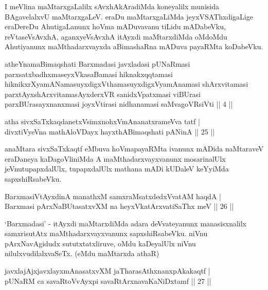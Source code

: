 \begin{artha}
I meVlina maMtarxgaLalilx sAvxhAkAradiMda koneyalilx munisida BAgavelalxvU maMtarxgaLeV. eraDu maMtarxgaLiMda jeyxVSAThxdigaLige eraDereDu AhutigaLanunx hoVma mADuvavanu tiLidu mADabeVku, reVtaseVsAvxhA, aganxyeVsAvxhA itAyxdi maMtarxdiMda oMdoMdu Ahutiyanunx maMthadarxvayxda aBimashaRna mADuva payaRMta koDabeVku.
\end{artha}


\begin{shl}
atheYnamaBimaqshati Barxmadasi javxladasi pUNaRmasi parxsatxbadhxmaseyxVkasaBamasi hiknakxqqtamasi hiknikxrXyamANamasuyxdigxVthamasuyxdigxVyamAnamasi shArxvitamasi parxtAyxshArxvitamasAyxderxVR sanidxVpatxmasi viBUrasi parxBUrasayxnanxmasi joyxVtirasi nidhanamasi saMvagoVR\s siVti || 4 ||
\end{shl}


\begin{shl}
atha sivxSaTxkaqdanetxV\s simxnohxVmAnanatxrameVva tatf | \\
divxtiVyeVna mathA\s \s loVDayx hayxthABimaqshati pANinA \hfill|| 25 || 
\end{shl}

\begin{artha}
anaMtara sivxSaTxkaqtf eMbuva hoVmapayaRMta ivanunx mADida naMtaraveV eraDaneya kaDagoVliniMda A maMthadarxvayxvanunx mosarinalUlx jeVnutupapxdalUlx, tupapxdalUlx mathana mADi kUDaleV keYyiMda sapxshiRsabeVku.
\end{artha}


\begin{shl}
BarxmasiVtAyxdinA manathxM samxraMsatxdedxVvatAM haqdA | \\
Barxmasi pArxNaBUtasatxvXM na heyxVkatArxvatiSaThx meV \hfill|| 26 || 
\end{shl}

\begin{artha}
`Barxmadasi' - itAyxdi maMtarxdiMda adara deVvateyanunx manasisxnalilx samxrisutAtx maMthadarxvayxvanunx sapxshiRsabeVku. niVnu pArxNavAgidudx sututxtatxliruve, oMdu kaDeyalUlx niVnu nilulxvudilalxvaSeTx. (eMdu maMtarxda athaR)
\end{artha}


\begin{shl}
javxlajAjxjavxlayxmAnasatxvXM jaTharasAthxnanxpAkakaqtf | \\
pUNaRM ca savaRtoVvAyxpi savaRtArxnavaKaNiDxtamf \hfill|| 27 || 
\end{shl}


